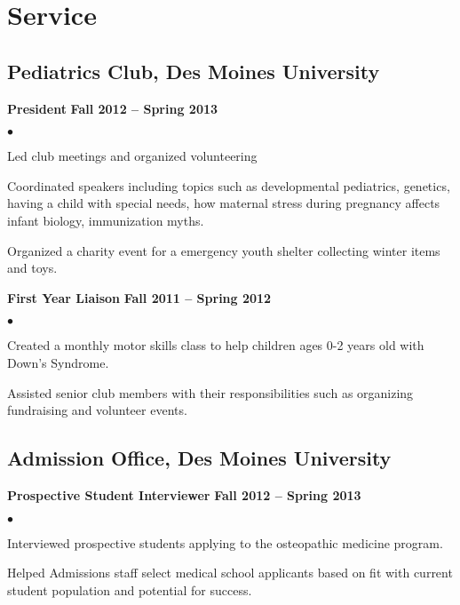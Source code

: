 \documentclass[11pt,letterpaper]{article}
\renewenvironment{itemize}{
  \begin{list}{}{
      \setlength{\leftmargin}{1.5em}
      \setlength{\itemsep}{0.25em}
      \setlength{\parskip}{0pt}
      \setlength{\parsep}{0.25em}
    }
  }{
  \end{list}
}
\newenvironment{bitemize}{
  \begin{list}{$\bullet$}{
      \setlength{\leftmargin}{1.5em}
      \setlength{\itemsep}{0.25em}
      \setlength{\parskip}{0pt}
      \setlength{\parsep}{0.25em}
    }
  }{
  \end{list}
}
\newcommand{\yearrange}[1]{\hfill \textbf{#1} \par}
\begin{document}
\section*{Service}
\subsection*{Pediatrics Club, Des Moines University}
\begin{itemize}
\item \textbf{President} \yearrange{Fall 2012 -- Spring 2013}
  \begin{bitemize}
  \item Led club meetings and organized volunteering
  \item Coordinated speakers including topics such as developmental
    pediatrics, genetics, having a child with special needs, how
    maternal stress during pregnancy affects infant biology,
    immunization myths.
  \item Organized a charity event for a emergency youth shelter
    collecting winter items and toys.
  \end{bitemize}
\item \textbf{First Year Liaison} \yearrange{Fall 2011 -- Spring 2012}
  \begin{bitemize}
  \item Created a monthly motor skills class to help children ages 0-2 years old with Down's Syndrome.
  \item Assisted senior club members with their responsibilities such as organizing fundraising and volunteer events.
  \end{bitemize}
\end{itemize}

\subsection*{Admission Office, Des Moines University}
\begin{itemize}
\item \textbf{Prospective Student Interviewer} \yearrange{Fall 2012 -- Spring 2013}
  \begin{bitemize}
  \item Interviewed prospective students applying to the osteopathic
    medicine program.
   \item Helped Admissions staff select medical school applicants based on fit with current student population and potential for success.
  \end{bitemize}
\end{itemize}
\end{document}
